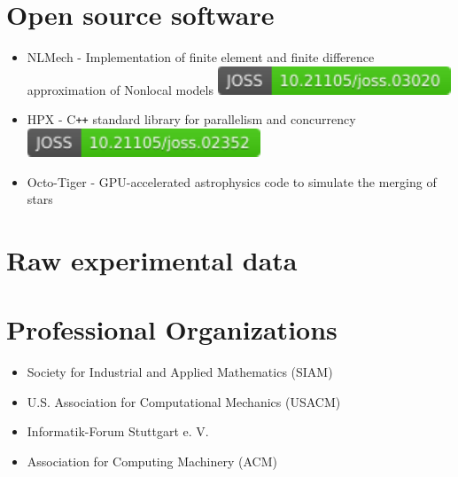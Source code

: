 \documentclass[11pt,a4paper,sans]{moderncv}
\begin{document}
\section{Open source software}
\cvitem{}{}
\begin{itemize}[leftmargin=4cm]
\item NLMech - Implementation of finite element and finite difference approximation of Nonlocal models \href{https://doi.org/10.21105/joss.03020}{\includegraphics[scale=0.5]{status-nlmech-small.pdf}}
\item HPX - C\texttt{++} standard library for parallelism and concurrency \href{https://doi.org/10.21105/joss.02352}{\includegraphics[scale=0.5]{status-hpx.pdf}}
\item Octo-Tiger - GPU-accelerated astrophysics code to simulate the merging of stars
\end{itemize}


\section{Raw experimental data}
\section{Professional Organizations}
\cvitem{}{}
\begin{itemize}[leftmargin=4cm]
\item Society for Industrial and Applied Mathematics (SIAM)
\item U.S. Association for Computational Mechanics (USACM)
\item Informatik-Forum Stuttgart e. V.
\item Association for Computing Machinery (ACM)
\end{itemize}

\end{document}
